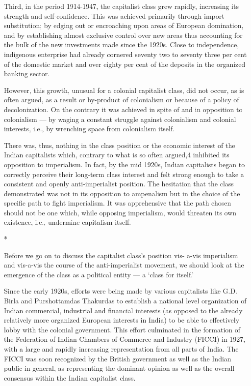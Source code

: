 Third, in the period 1914-1947, the capitalist class grew rapidly, increasing its strength and self-confidence. This was achieved primarily through import substitution; by edging out or encroaching upon areas of European domination, and by establishing almost exclusive control over new areas thus accounting for the bulk of the new investments made since the 1920s. Close to independence, indigenous enterprise had already cornered seventy two to seventy three per cent of the domestic market and over eighty per cent of the deposits in the organized banking sector. 

However, this growth, unusual for a colonial capitalist class, did not occur, as is often argued, as a result or by-product of colonialism or because of a policy of decolonization. On the contrary it was achieved in spite of and in opposition to colonialism — by waging a constant struggle against colonialism and colonial interests, i.e., by wrenching space from colonialism itself. 

There was, thus, nothing in the class position or the economic interest of the Indian capitalists which, contrary to what is so often argued,4 inhibited its opposition to imperialism. In fact, by the mid 1920s, Indian capitalists began to correctly perceive their long-term class interest and felt strong enough to take a consistent and openly anti-imperialist position. The hesitation that the class demonstrated was not in its opposition to ampenalism but in the choice of the specific path to fight imperialism. It was apprehensive that the path chosen should not be one which, while opposing imperialism, would threaten its own existence, i.e., undermine capitalism itself.

\begin{center}*\end{center}

Before we go on to discuss the capitalist class’s position vis- a-vis imperialism and vis-a-vis the course of the anti-imperialist movement, we should look at the emergence of the class as a political entity — a ‘class for itself.’ 

Since the early 1920s, efforts were being made by various capitalists like G.D. Birla and Purshottamdas Thakurdas to establish a national level organization of Indian commercial, industrial and financial interests (as opposed to the already relatively more organized European interests in India) to be able to effectively lobby with the colonial government. This effort culminated in the formation of the Federation of Indian Chambers of Commerce and Industry (FICCI) in 1927, with a large and rapidly increasing representation from all parts of India. The FICCI was soon recognized by the British government as well as the Indian public in general, as representing the dominant opinion as well as the overall consensus within the Indian capitalist class. 

